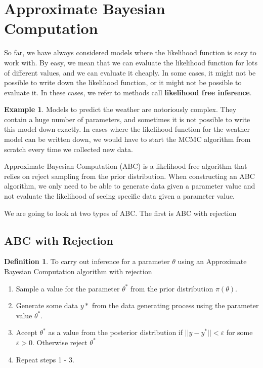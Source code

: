 \documentclass[
]{book}
\providecommand{\tightlist}{%
  \setlength{\itemsep}{0pt}\setlength{\parskip}{0pt}}
\theoremstyle{definition}
\newtheorem{definition}{Definition}[chapter]
\theoremstyle{definition}
\newtheorem{example}{Example}[chapter]
\theoremstyle{definition}
\theoremstyle{definition}
\theoremstyle{remark}
\begin{document}
\hypertarget{approximate-bayesian-computation}{%
\section{Approximate Bayesian Computation}\label{approximate-bayesian-computation}}

So far, we have always considered models where the likelihood function is easy to work with. By easy, we mean that we can evaluate the likelihood function for lots of different values, and we can evaluate it cheaply. In some cases, it might not be possible to write down the likelihood function, or it might not be possible to evaluate it. In these cases, we refer to methods call \textbf{likelihood free inference}.

\begin{example}
Models to predict the weather are notoriously complex. They contain a huge number of parameters, and sometimes it is not possible to write this model down exactly. In cases where the likelihood function for the weather model can be written down, we would have to start the MCMC algorithm from scratch every time we collected new data.
\end{example}

Approximate Bayesian Computation (ABC) is a likelihood free algorithm that relies on reject sampling from the prior distribution. When constructing an ABC algorithm, we only need to be able to generate data given a parameter value and not evaluate the likelihood of seeing specific data given a parameter value.

We are going to look at two types of ABC. The first is ABC with rejection

\hypertarget{abc-with-rejection}{%
\subsection{ABC with Rejection}\label{abc-with-rejection}}

\begin{definition}

To carry out inference for a parameter \(\theta\) using an Approximate Bayesian Computation algorithm with rejection

\begin{enumerate}
\def\labelenumi{\arabic{enumi}.}
\tightlist
\item
  Sample a value for the parameter \(\theta^*\) from the prior distribution \(\pi(\theta)\).
\item
  Generate some data \(y*\) from the data generating process using the parameter value \(\theta^*\).
\item
  Accept \(\theta^*\) as a value from the posterior distribution if \(||y - y^*|| < \varepsilon\) for some \(\varepsilon > 0\). Otherwise reject \(\theta^*\)
\item
  Repeat steps 1 - 3.
\end{enumerate}

\end{definition}
\end{document}

